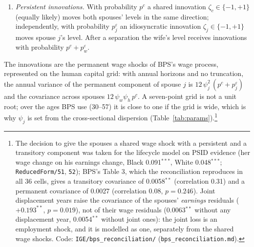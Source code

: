 \documentclass[11pt]{article}
\newcommand{\code}[1]{\texttt{#1}}
\newcommand{\1}{\mathbf{1}}
\begin{document}
\begin{enumerate}
{  before plant closures) is reported, not modelled: there is no anticipation in the model, as in BPS, who find no
  advance information ($p=0.29$).} Whether $d_j$ is needed is decided by the earnings on re-employment by the length
  of non-employment after an involuntary separation (1--3, 4--12, 13--24 months; a target, Table~\ref{tab:targets}):
  depreciation alone makes the loss grow with the spell from close to zero, while $d_j$ adds a loss at re-employment
  after even a short spell. If the loss after 1--3 months is close to zero, $d_j$ is cut and the PSID years 1--3
  earnings loss must be reproduced by depreciation over the spell; if it is not, $d_j$ stays.\footnote{For all
  separations in the SIPP 1995--2016, \citet{bacher2025joint} (their Table 8) report earnings in the first month of
  re-employment 1\%, 7\% and 20\% below the last month of the previous job after 1--3, 4--12 and 13--24 months of
  non-employment, and match it with depreciation that does not depend on the level. Paper A's version restricts the
  separations to involuntary ones and reports it by spouse, from the SIPP panel 2003--2016 (\code{IGE/40.SIPPJointLoss.py};
  computed in \code{IGE/60.PaperATargets.py}).}
  \item \emph{Persistent innovations.} With probability $p^c$ a shared innovation $\zeta_c \in \{-1, +1\}$ (equally
  likely) moves both spouses' levels in the same direction; independently, with probability $p^\varepsilon_j$ an
  idiosyncratic innovation $\zeta_j \in \{-1, +1\}$ moves spouse $j$'s level. After a separation the wife's level
  receives innovations with probability $p^c + p^\varepsilon_w$.
\end{enumerate}
The innovations are the permanent wage shocks of BPS's wage process, represented on the human capital grid: with
annual horizons and no truncation, the annual variance of the permanent component of spouse $j$ is
$12\,\psi_j^2\,(p^c + p^\varepsilon_j)$ and the covariance across spouses $12\,\psi_w\psi_h\,p^c$. A seven-point grid is
not a unit root; over the ages BPS use (30--57) it is close to one if the grid is wide, which is why $\psi_j$ is set
from the cross-sectional dispersion (Table~\ref{tab:params}).\footnote{The decision to give the spouses a shared wage
shock with a persistent and a transitory component was taken for the lifecycle model on PSID evidence (her wage change
on his earnings change, Black 0.091$^{***}$, White 0.048$^{***}$; \code{ReducedForm/51}, \code{52}); BPS's Table 3, which
the reconciliation reproduces in all 36 cells, gives a transitory covariance of 0.0058$^{**}$ (correlation 0.31) and a
permanent covariance of 0.0027 (correlation 0.08, $p=0.246$). Joint displacement years raise the covariance of the
spouses' \emph{earnings} residuals ($+0.193^{**}$, $p=0.019$), not of their wage residuals (0.0063$^{**}$ without any
displacement year, 0.0054$^{**}$ without joint ones): the joint loss is an employment shock, and it is modelled as one,
separately from the shared wage shocks. Code: \code{IGE/bps\_reconciliation/} (\code{bps\_reconciliation.md}).}
\end{document}
